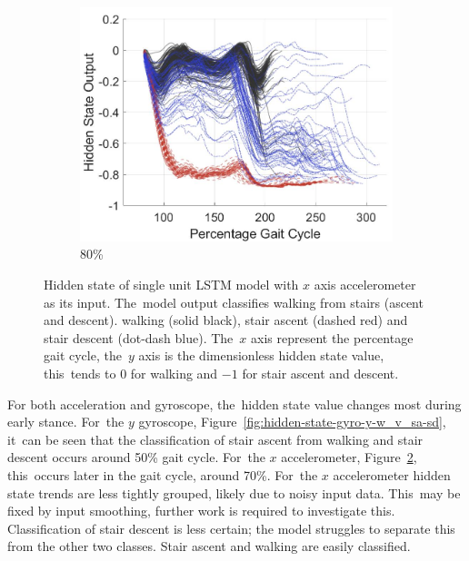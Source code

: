 \begin{figure}[!hbt]
     \begin{subfigure}[H]{0.28\textwidth}
         \centering
         \includegraphics[width=\textwidth]{content/4-LSTM_Behaviour/results/hidden_state/accel_x_w_v_sa-sd/80_Participant_04.jpg}
         \caption{80\%}
         \label{subfig:e}
     \end{subfigure}
\vspace{3pt}
    \caption[Hidden state of single unit LSTM model with $x$ axis accelerometer as its input.]{Hidden state of single unit LSTM model with $x$ axis accelerometer as its input. The~model output classifies walking from stairs (ascent and descent). walking (solid black), stair ascent (dashed red) and stair descent (dot-dash blue). The~$x$ axis represent the percentage gait cycle, the~$y$ axis is the dimensionless hidden state value, this~tends to $0$ for walking and $-1$ for stair ascent and descent.}
    \label{fig:hidden-state-accel-x-w_v_sa-sd}
\end{figure}


For both acceleration and gyroscope, the~hidden state value changes most during early stance. For~the $y$ gyroscope, Figure~\ref{fig:hidden-state-gyro-y-w_v_sa-sd}, it~can be seen that the classification of stair ascent from walking and stair descent occurs around 50\% gait cycle. For~the $x$ accelerometer, Figure~\ref{fig:hidden-state-accel-x-w_v_sa-sd}, this~occurs later in the gait cycle, around 70\%. For~the $x$ accelerometer hidden state trends are less tightly grouped, likely due to noisy input data. This~may be fixed by input smoothing, further work is required to investigate this. Classification of stair descent is less certain; the model struggles to separate this from the other two classes. Stair ascent and walking are easily classified.

